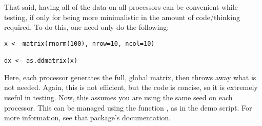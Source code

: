 That said, having all of the data on all processors can be convenient while 
testing, if only for being more minimalistic in the amount of code/thinking 
required.  To do this, one need only do the following:

\begin{lstlisting}[language=rr]
x <- matrix(rnorm(100), nrow=10, ncol=10)

dx <- as.ddmatrix(x)
\end{lstlisting}

Here, each processor generates the full, global matrix, then throws away what is 
not needed.  Again, this is not efficient, but the code is concise, so it is 
extremely useful in testing.  Now, this assumes you are using the same seed on 
each processor.  This can be managed using the  function 
, as in the demo script.  For more information, see that 
package's documentation.

